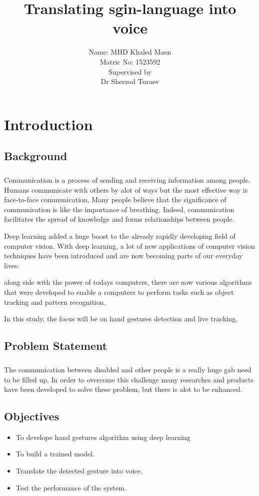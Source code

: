 \documentclass[12pt]{report}
\title{Translating sgin-language into voice}
\author{ Name: MHD Khaled Maen\\
	Matric No: 1523592 \\ 
	[1cm]
	Supervised by\\
	[1.5cm]
	Dr Sherzod Turaev\\}
\begin{document}
\maketitle
{}                   
\setcounter{page}{2}                    
\tableofcontents
\newpage
{}
\chapter{Introduction} 
    \section{Background}
    \paragraph{}
    Communication is a process of sending and receiving information among people. 
    Humans communicate with others by alot of ways but the most effective way is  face-to-face communication, 
    Many people believe that the significance of communication is like the importance of breathing. 
    Indeed, communication facilitates the spread of knowledge and forms relationships between people.

    Deep learning added a huge boost to the already rapidly developing field of computer vision.
    With deep learning, a lot of new applications of computer vision techniques have been introduced and are now becoming parts of our everyday lives.

    along side with  the power of todays computers, there are now various algorithms that were developed to enable a
    computers to perform tasks such as object tracking and pattern recognition. 
    
    In this study, the focus will be on hand gestures detection and live tracking. 
    \section{Problem Statement}
    \paragraph{}
    The communication between disabled and other people is
    a really huge gab need to be filled up.
    In order to overcome this challenge many researches and products have been developed to solve these problem, 
    but there is alot to be enhanced.
    
    \section{Objectives}
    \begin{itemize}
        \item To develope hand gestures algorithm using deep learning
        \item To build a trained model.
        \item Translate the detected gesture into voice.
        \item Test the performance of the system.
    \end{itemize}

    
    
\end{document}

